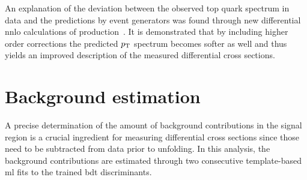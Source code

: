 
An explanation of the deviation between the observed top quark \pt spectrum in data and the predictions by event generators was found through new differential \gls{nnlo} calculations of \ttbar production~\cite{Czakon:2015owf}. It is demonstrated that by including higher order corrections the predicted $p_\textrm{T}$ spectrum becomes softer as well and thus yields an improved description of the measured differential \ttbar cross sections.



\section{Background estimation}
\label{sec:polarization-fit}

A precise determination of the amount of background contributions in the signal region is a crucial ingredient for measuring differential cross sections since those need to be subtracted from data prior to unfolding. In this analysis, the background contributions are estimated through two consecutive template-based \gls{ml} fits to the trained \gls{bdt} discriminants.


